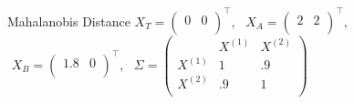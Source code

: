 \documentclass[xcolor=dvipsnames]{beamer}
\begin{document}
\begin{frame}{Mahalanobis Distance}
\scriptsize
$X_T=\left(\begin{array}{cc} 0 & 0 \\\end{array}    \right)^{\top}, $
$\,\, X_A=\left(                 \begin{array}{cc}                   2 &  2 \\                 \end{array}               \right)^{\top}, $
$\,\, X_B=\left(                 \begin{array}{cc}                   1.8 &  0 \\                 \end{array}               \right)^{\top}, $
$\,\,\Sigma=\left(                \begin{array}{ccc}           & X^{(1)} & X^{(2)} \\                  X^{(1)} & 1 &  .9 \\                  X^{(2)} & .9 & 1\\                \end{array}              \right)$


\end{frame}
\end{document}
